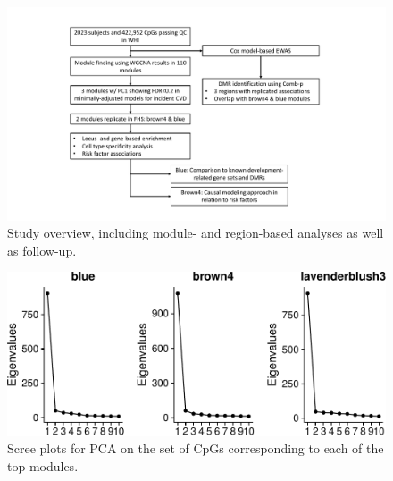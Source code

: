 \documentclass[]{article}
\theoremstyle{definition}
\theoremstyle{definition}
\theoremstyle{definition}
\theoremstyle{remark}
\begin{document}
\newcommand{\beginsupplement}{
  \setcounter{table}{0}  
  \renewcommand{\thetable}{S\arabic{table}} 
  \setcounter{figure}{0} 
  \renewcommand{\thefigure}{S\arabic{figure}}
}

\beginsupplement

\begin{figure}[htbp]
\centering
\includegraphics{../doc/module_ewas/workflow.pdf}
\caption{\label{fig:workflow}Study overview, including module- and
region-based analyses as well as follow-up.}
\end{figure}

\begin{figure}[htbp]
\centering
\includegraphics{../doc/module_ewas/figures/print-scree-plots-1.pdf}
\caption{\label{fig:print-scree-plots}Scree plots for PCA on the set of CpGs
corresponding to each of the top modules.}
\end{figure}
\end{document}
